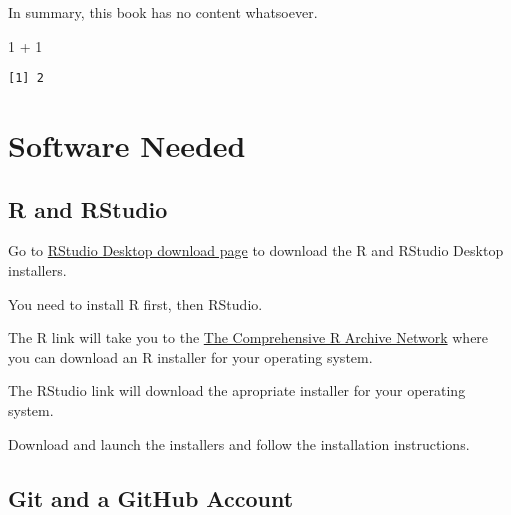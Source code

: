 \documentclass[
  letterpaper,
  DIV=11,
  numbers=noendperiod]{scrreprt}
\newenvironment{Shaded}{\begin{snugshade}}{\end{snugshade}}
\newcommand{\DecValTok}[1]{\textcolor[rgb]{0.68,0.00,0.00}{#1}}
\newcommand{\SpecialCharTok}[1]{\textcolor[rgb]{0.37,0.37,0.37}{#1}}
\begin{document}
In summary, this book has no content whatsoever.

\begin{Shaded}
\begin{Highlighting}[]
\DecValTok{1} \SpecialCharTok{+} \DecValTok{1}
\end{Highlighting}
\end{Shaded}

\begin{verbatim}
[1] 2
\end{verbatim}


\chapter{Software Needed}\label{sec-software-needed}

\section{R and RStudio}\label{r-and-rstudio}

Go to \href{https://posit.co/download/rstudio-desktop/}{RStudio Desktop
download page} to download the R and RStudio Desktop installers.

\begin{tcolorbox}[enhanced jigsaw, colback=white, breakable, titlerule=0mm, leftrule=.75mm, opacitybacktitle=0.6, bottomtitle=1mm, rightrule=.15mm, coltitle=black, arc=.35mm, bottomrule=.15mm, toprule=.15mm, title=\textcolor{quarto-callout-note-color}{\faInfo}\hspace{0.5em}{Note}, left=2mm, opacityback=0, colbacktitle=quarto-callout-note-color!10!white, colframe=quarto-callout-note-color-frame, toptitle=1mm]

You need to install R first, then RStudio.

\end{tcolorbox}

The R link will take you to the \href{https://cran.rstudio.com/}{The
Comprehensive R Archive Network} where you can download an R installer
for your operating system.

The RStudio link will download the apropriate installer for your
operating system.

Download and launch the installers and follow the installation
instructions.

\section{Git and a GitHub Account}\label{git-and-a-github-account}
\end{document}
